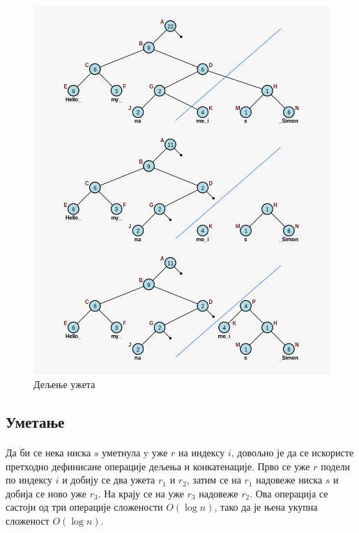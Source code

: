 \documentclass[12pt,oneside]{memoir}
\begin{document}
\begin{figure}
  \centering
  \includegraphics[width=1.0\textwidth]{images/rope_split.png}
  \caption{Дељење ужета}
  \label{fig:ropе_split}
\end{figure} 

\subsection{Уметање}
\paragraph{}
Да би се нека ниска \(s\) уметнула y уже \(r\) на индексу \(i\), довољно је да се искористе претходно дефинисане операције дељења и конкатенације. Прво се уже \(r\) подели по индексу \(i\)
и добију се два ужета \(r_1\) и \(r_2\), затим се на \(r_1\) надовеже ниска \(s\) и добија се
ново уже \(r_3\). На крају се на уже \(r_3\) надовеже \(r_2\). Ова операција се састоји
од три операције сложености \(O(\log{}n)\), тако да је њена укупна сложеност \(O(\log{}n)\).
\end{document}
